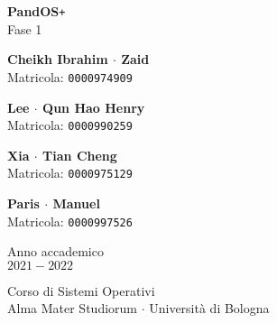 \documentclass[11pt]{article}
\begin{document}
\graphicspath{ {./img/} }
\begin{titlepage}
    \begin{center}
        \vspace*{1.5cm}
            
        \Huge
        \textbf{PandOS}\texttt{+} \\
        \LARGE
        Fase 1
                        
        \vspace{2.0cm}
          
        \begin{minipage}[t]{0.47\textwidth}
        \begin{center}
        	{\large{\bf Cheikh Ibrahim $\cdot$ Zaid}}\\
			{\large Matricola: \texttt{0000974909}}
        \end{center}

		\end{minipage}
		\hfill
		\begin{minipage}[t]{0.47\textwidth}\raggedleft
		\begin{center}
        	{\large{\bf Lee $\cdot$ Qun Hao Henry}}\\
			{\large Matricola: \texttt{0000990259}}
        \end{center}
		\end{minipage}

        \vspace{1cm}

        \begin{minipage}[t]{0.47\textwidth}
            \begin{center}
                {\large{\bf Xia $\cdot$ Tian Cheng}}\\
                {\large Matricola: \texttt{0000975129}}
            \end{center}
    
            \end{minipage}
            \hfill
            \begin{minipage}[t]{0.47\textwidth}\raggedleft
            \begin{center}
                {\large{\bf Paris $\cdot$ Manuel}}\\
                {\large Matricola: \texttt{0000997526}}
            \end{center}
            \end{minipage}  
            
        \vspace{6cm}
            
        Anno	 accademico\\
        $2021 - 2022$
            
        \vspace{0.8cm}
            
            
        \Large
        Corso di Sistemi Operativi\\
        Alma Mater Studiorum $\cdot$ Università di Bologna\\
            
    \end{center}
\end{titlepage}
\pagebreak
\end{document}

